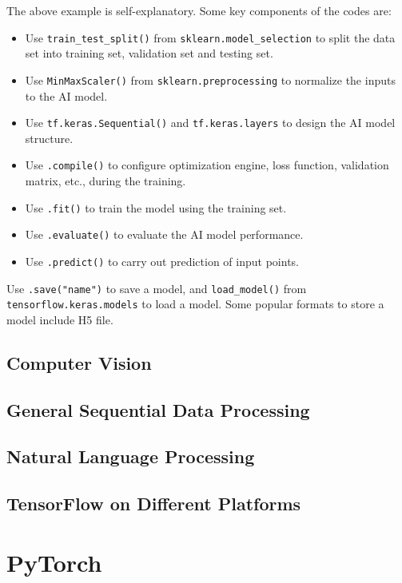 The above example is self-explanatory. Some key components of the codes are:
\begin{itemize}
  \item Use \verb|train_test_split()| from \verb|sklearn.model_selection| to split the data set into training set, validation set and testing set.
  \item Use \verb|MinMaxScaler()| from \verb|sklearn.preprocessing| to normalize the inputs to the AI model.
  \item Use \verb|tf.keras.Sequential()| and \verb|tf.keras.layers| to design the AI model structure.
  \item Use \verb|.compile()| to configure optimization engine, loss function, validation matrix, etc., during the training.
  \item Use \verb|.fit()| to train the model using the training set.
  \item Use \verb|.evaluate()| to evaluate the AI model performance.
  \item Use \verb|.predict()| to carry out prediction of input points.
\end{itemize}

Use \verb|.save("name")| to save a model, and \verb|load_model()| from \verb|tensorflow.keras.models| to load a model. Some popular formats to store a model include H5 file.




\subsection{Computer Vision}

\subsection{General Sequential Data Processing}

\subsection{Natural Language Processing}

\subsection{TensorFlow on Different Platforms}

\section{PyTorch}

